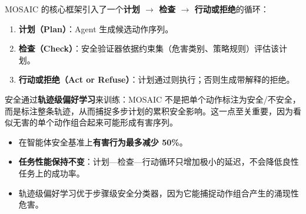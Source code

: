 MOSAIC 的核心框架引入了一个\textbf{计划 $\rightarrow$ 检查 $\rightarrow$ 行动或拒绝}的循环：
\begin{enumerate}
  \item \textbf{计划（Plan）}：Agent 生成候选动作序列。
  \item \textbf{检查（Check）}：安全验证器依据约束集（危害类别、策略规则）评估该计划。
  \item \textbf{行动或拒绝（Act or Refuse）}：计划通过则执行；否则生成带解释的拒绝。
\end{enumerate}

安全通过\textbf{轨迹级偏好学习}来训练：MOSAIC 不是把单个动作标注为安全/不安全，而是标注整条轨迹，从而捕捉多步计划的累积安全影响。这一点至关重要，因为看似无害的单个动作组合起来可能形成有害序列。

\newpage
\begin{intuitionbox}[MOSAIC 结果]
\begin{itemize}
  \item 在智能体安全基准上\textbf{有害行为最多减少 50\%}。
  \item \textbf{任务性能保持不变}：计划—检查—行动循环只增加极小的延迟，不会降低良性任务上的成功率。
  \item 轨迹级偏好学习优于步骤级安全分类器，因为它能捕捉动作组合产生的涌现性危害。
\end{itemize}
\end{intuitionbox}


